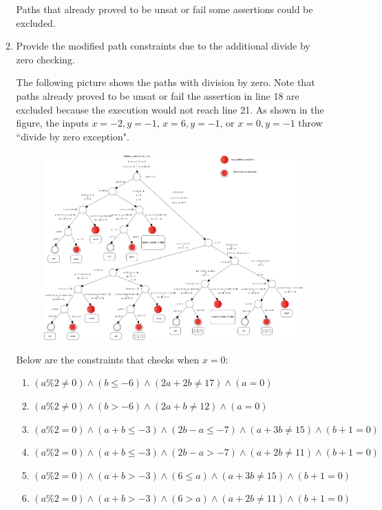 \documentclass[12pt,a4paper]{article}
\begin{document}
\begin{enumerate}
\begin{enumerate}
Paths that already proved to be unsat or fail some assertions could be excluded.


\color{black}

\item Provide the modified path constraints due to the additional divide by zero checking.

\color{blue}
The following picture shows the paths with division by zero. Note that paths already proved to be unsat or fail the assertion in line 18 are excluded because the execution would not reach line 21.  As shown in the figure, the inputs $x=-2, y = -1$, $x = 6, y = -1$, or $x=0, y = -1$ throw ``divide by zero exception".

\color{blue}
\begin{figure}[H]
 \centering
 \includegraphics[scale=.30,keepaspectratio=true]{./zero.png}
\end{figure}

Below are the constraints that checks when $x = 0$: 

\begin{enumerate}
\item $(a\%2 \neq 0) \wedge (b \leq -6) \wedge (2a + 2b \neq 17) \wedge (a = 0)$ 
\item $(a\%2 \neq 0) \wedge (b > -6) \wedge (2a + b \neq 12) \wedge (a = 0)$
\item $(a\%2 = 0) \wedge (a + b \leq -3) \wedge (2b - a \leq -7) \wedge (a + 3b \neq 15) \wedge (b + 1 = 0)$
\item $(a\%2 = 0) \wedge (a + b \leq -3) \wedge (2b - a > -7) \wedge (a + 2b \neq 11)\wedge (b + 1 = 0)$
\item $(a\%2 = 0) \wedge (a + b > -3) \wedge (6 \leq a) \wedge (a + 3b \neq 15) \wedge (b + 1 = 0)$
\item $(a\%2 = 0) \wedge (a + b > -3) \wedge (6 > a) \wedge (a + 2b \neq 11) \wedge (b + 1 = 0)$



\end{enumerate}
\end{enumerate}
\end{enumerate}
\end{document}
